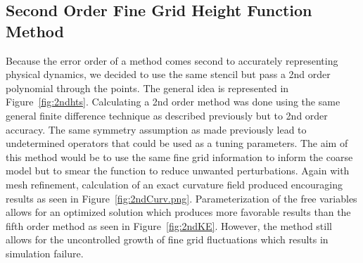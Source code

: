 \subsection{Second Order Fine Grid Height Function Method}
Because the error order of a method comes second to accurately representing physical dynamics, we decided to use the same stencil but pass a 2nd order polynomial through the points. The general idea is represented in Figure~\ref{fig:2ndhts}. Calculating a 2nd order method was done using the same general finite difference technique as described previously but to 2nd order accuracy. The same symmetry assumption as made previously lead to undetermined operators that could be used as a tuning parameters. The aim of this method would be to use the same fine grid information to inform the coarse model but to smear the function to reduce unwanted perturbations. Again with mesh refinement, calculation of an exact curvature field produced encouraging results as seen in Figure~\ref{fig:2ndCurv.png}.   Parameterization of the free variables allows for an optimized solution which produces more favorable results than the fifth order method as seen in Figure~\ref{fig:2ndKE}. However, the method still allows for the uncontrolled growth of fine grid fluctuations which results in simulation failure. 
